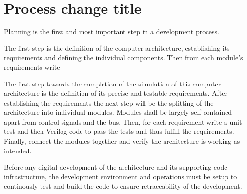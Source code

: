 \chapter{Process change title}


Planning is the first and most important step in a development process.

The first step is the definition of the computer architecture, establishing its requirements and defining the individual components. Then from each module's requirements write

The first step towards the completion of the simulation of this computer architecture is the definition of its precise and testable requirements. After establishing the requirements the next step will be the splitting of the architecture into individual modules. Modules shall be largely self-contained apart from control signals and the bus. Then, for each requirement write a unit test and then Verilog code to pass the tests and thus fulfill the requirements. Finally, connect the modules together and verify the architecture is working as intended. 

Before any digital development of the architecture and its supporting code infrastructure, the development environment and operations must be setup to continously test and build the code to ensure retraceability of the development.
 



